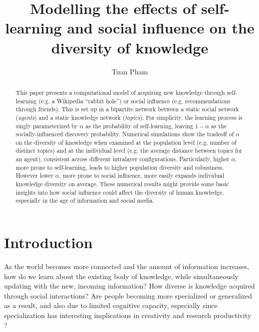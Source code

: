 \documentclass{svproc}
\begin{document}
\mainmatter
\title{Modelling the effects of self-learning and social influence on the diversity of knowledge}


\author{Tuan Pham}

\def\githubrepo{https://github.com/tuanpham96/topic-diversity}

\maketitle

\begin{abstract}
    This paper presents a computational model of acquiring new knowledge through self-learning (e.g. a Wikipedia ``rabbit hole'') or social influence (e.g. recommendations through friends).
    This is set up in a bipartite network between a static social network (\textit{agents}) and a static knowledge network (\textit{topics}).
    For simplicity, the learning process is singly parameterized by $\alpha$ as the probability of self-learning, leaving $1-\alpha$ as the socially-influenced discovery probability.
    Numerical simulations show the tradeoff of $\alpha$ on the diversity of knowledge when examined at the population level (e.g. number of distinct topics) and at the individual level (e.g. the average distance between topics for an agent), consistent across different intralayer configurations.
    Particularly, higher $\alpha$, more prone to self-learning, leads to higher population diversity and robustness.
    However lower $\alpha$, more prone to social influence, more easily expands individual knowledge diversity on average.
    These numerical results might provide some basic insights into how social influence could affect the diversity of human knowledge, especially in the age of information and social media.
\end{abstract}

\section{Introduction} \label{sec:intro}

As the world becomes more connected and the amount of information increases, how do we learn about the existing body of knowledge, while simultaneously updating with the new, incoming information?
How diverse is knowledge acquired through social interactions?
Are people becoming more specialized or generalized as a result, and also due to limited cognitive capacity, especially since specialization has interesting implications in creativity and research productivity \cite{Teodoridis2019-tc}?
\end{document}
